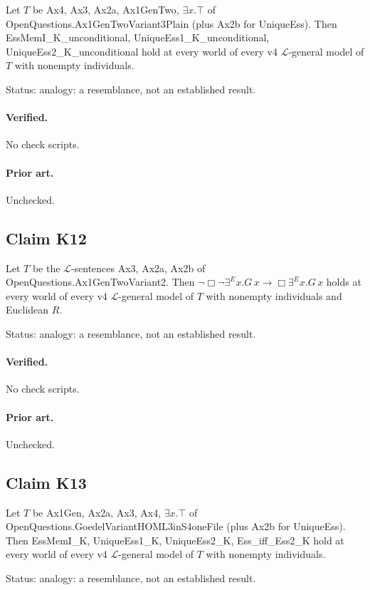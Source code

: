 \documentclass{article}
\begin{document}
Let $T$ be Ax4, Ax3, Ax2a, Ax1GenTwo, $\exists x.\top$ of OpenQuestions.Ax1GenTwoVariant3Plain (plus Ax2b for UniqueEss). Then EssMemI\_K\_unconditional, UniqueEss1\_K\_unconditional, UniqueEss2\_K\_unconditional hold at every world of every v4 $\mathcal L$-general model of $T$ with nonempty individuals.

Status: analogy: a resemblance, not an established result.

\paragraph{Verified.}
No check scripts.

\paragraph{Prior art.} Unchecked.

\subsection*{Claim K12}

Let $T$ be the $\mathcal L$-sentences Ax3, Ax2a, Ax2b of OpenQuestions.Ax1GenTwoVariant2. Then $\neg\Box\neg\exists^E x.G\,x\to\Box\exists^E x.G\,x$ holds at every world of every v4 $\mathcal L$-general model of $T$ with nonempty individuals and Euclidean $R$.

Status: analogy: a resemblance, not an established result.

\paragraph{Verified.}
No check scripts.

\paragraph{Prior art.} Unchecked.

\subsection*{Claim K13}

Let $T$ be Ax1Gen, Ax2a, Ax3, Ax4, $\exists x.\top$ of OpenQuestions.GoedelVariantHOML3inS4oneFile (plus Ax2b for UniqueEss). Then EssMemI\_K, UniqueEss1\_K, UniqueEss2\_K, Ess\_iff\_Ess2\_K hold at every world of every v4 $\mathcal L$-general model of $T$ with nonempty individuals.

Status: analogy: a resemblance, not an established result.
\end{document}

